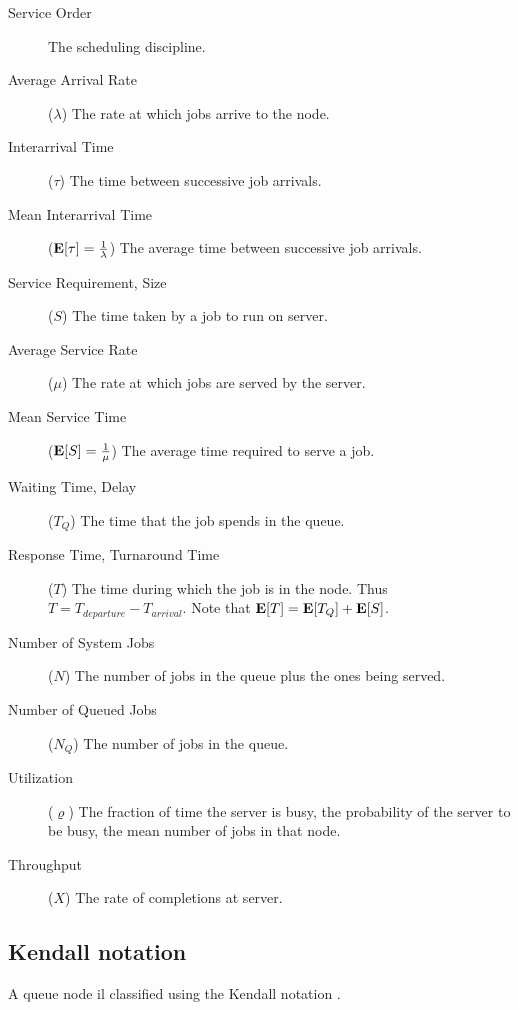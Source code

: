 \begin{description}
	\item [Service Order] The scheduling discipline.
	
	\item [Average Arrival Rate]  ($\lambda$) The rate at which jobs arrive to the node.
	
	\item [Interarrival Time] ($\tau$) The time between successive job arrivals.
	
	\item [Mean Interarrival Time] ($\mathbf{E}[\tau]=\frac{1}{\lambda}$) The average time between successive job arrivals.
	
	\item [Service Requirement, Size] ($S$) The time taken by a job to run on server.
	
	\item [Average Service Rate] ($\mu$) The rate at which jobs are served by the server.
	
	\item [Mean Service Time] ($\mathbf{E}[S]=\frac{1}{\mu}$) The average time required to serve a job.
	
	\item [Waiting Time, Delay] ($T_{Q}$) The time that the job spends in the queue.
	
	\item [Response Time, Turnaround Time] ($T$) The time during which the job is in the node. Thus $T=T_{departure}-T_{arrival}$. Note that $\mathbf{E}[T]=\mathbf{E}[T_{Q}]+\mathbf{E}[S]$.
	
	\item [Number of System Jobs] ($N$) The number of jobs in the queue plus the ones being served.
	
	\item [Number of Queued Jobs] ($N_{Q}$) The number of jobs in the queue.
	
	\item [Utilization] ($\varrho$) The fraction of time the server is busy, the probability of the server to be busy, the mean number of jobs in that node.
	
	\item [Throughput] ($X$) The rate of completions at server.
\end{description}




\subsection{Kendall notation}
A queue node il classified using the Kendall notation \cite{kendall1953stochastic}.


